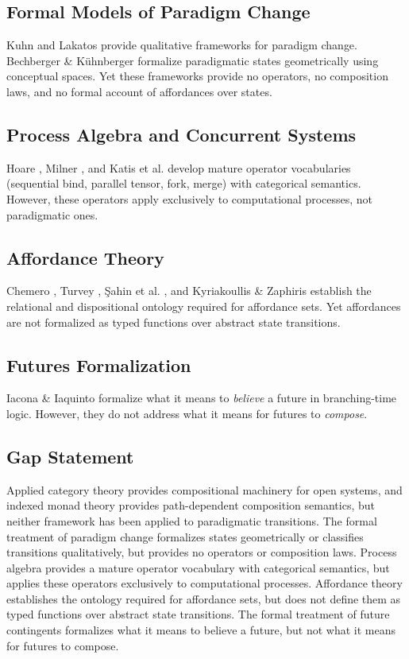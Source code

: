 \documentclass[11pt,a4paper]{article}
\begin{document}
\subsection{Formal Models of Paradigm Change}

Kuhn \cite{kuhn1962} and Lakatos \cite{lakatos1978} provide qualitative frameworks for paradigm change. Bechberger \& Kühnberger \cite{bechberger2017} formalize paradigmatic states geometrically using conceptual spaces. Yet these frameworks provide no operators, no composition laws, and no formal account of affordances over states.

\subsection{Process Algebra and Concurrent Systems}

Hoare \cite{hoare1985}, Milner \cite{milner1989}, and Katis et al. \cite{katis2009} develop mature operator vocabularies (sequential bind, parallel tensor, fork, merge) with categorical semantics. However, these operators apply exclusively to computational processes, not paradigmatic ones.

\subsection{Affordance Theory}

Chemero \cite{chemero2003}, Turvey \cite{turvey1992}, Şahin et al. \cite{sahin2007}, and Kyriakoullis \& Zaphiris \cite{kyriakoullis2016} establish the relational and dispositional ontology required for affordance sets. Yet affordances are not formalized as typed functions over abstract state transitions.

\subsection{Futures Formalization}

Iacona \& Iaquinto \cite{iacona2021} formalize what it means to \emph{believe} a future in branching-time logic. However, they do not address what it means for futures to \emph{compose}.

\subsection{Gap Statement}

Applied category theory provides compositional machinery for open systems, and indexed monad theory provides path-dependent composition semantics, but neither framework has been applied to paradigmatic transitions. The formal treatment of paradigm change formalizes states geometrically or classifies transitions qualitatively, but provides no operators or composition laws. Process algebra provides a mature operator vocabulary with categorical semantics, but applies these operators exclusively to computational processes. Affordance theory establishes the ontology required for affordance sets, but does not define them as typed functions over abstract state transitions. The formal treatment of future contingents formalizes what it means to believe a future, but not what it means for futures to compose.
\end{document}
